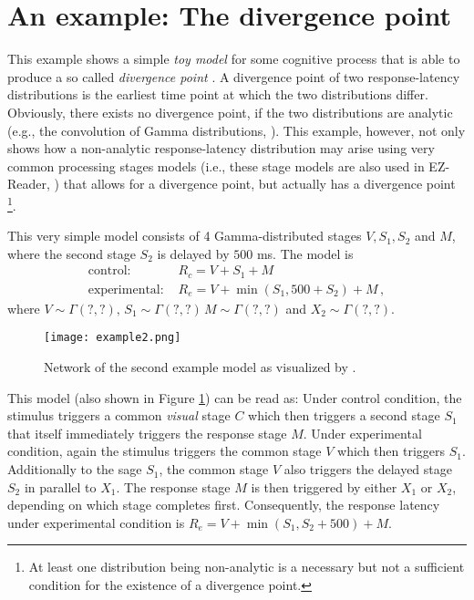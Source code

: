 \section{An example: The divergence point}
This example shows a simple \emph{toy model} for some cognitive process that is able to produce a
so called \emph{divergence point} \cite[e.g.,][]{Reingold2012}. A divergence point of two response-latency
distributions is the earliest time point at which the two distributions differ. Obviously, 
there exists no divergence point, if the two distributions are analytic 
(e.g., the convolution of Gamma distributions, \cite{Gelooven1999}). This example, however,
not only shows how a non-analytic response-latency distribution may arise using very common
processing stages models (i.e., these stage models are also used in EZ-Reader, \cite{Reichle2003}) 
that allows for a divergence point, but actually has a divergence point%
\footnote{At least one distribution being non-analytic is a necessary but not a sufficient
condition for the existence of a divergence point.}. 

This very simple model consists of 4 Gamma-distributed stages $V, S_1, S_2$ and $M$,
where the second stage $S_2$ is delayed by $500$ ms. 
The model is
\begin{align}
 \text{control: } & R_c = V + S_1 + M \\
 \text{experimental: } & R_e = V + \min(S_1, 500+S_2) + M\,,
\end{align}
where $V \sim \Gamma(?, ?),\,S_1\sim\Gamma(?,?)\,M\sim\Gamma(?,?)$ and $X_2 \sim\Gamma(?, ?)$.
\begin{figure}[!ht]
 \centering
 \texttt{[image: example2.png]}
 \caption{Network of the second example model as visualized by .} \label{fig:example2}
\end{figure}

This model (also shown in Figure \ref{fig:example2}) can be read as: Under control condition, the stimulus triggers a common \emph{visual} 
stage $C$ which then triggers a second stage $S_1$ that itself immediately triggers the response stage $M$. Under experimental condition,
again the stimulus triggers the common stage $V$ which then triggers $S_1$. Additionally to the sage $S_1$, the common
stage $V$ also triggers the delayed stage $S_2$ in parallel to $X_1$. The response stage $M$ is then triggered by 
either $X_1$ or $X_2$, depending on which stage completes first. Consequently, the response latency
under experimental condition is $R_e = V + \min(S_1,S_2+500) + M$.

